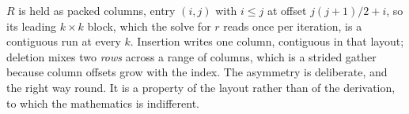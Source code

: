 \begin{remark}
$R$ is held as packed columns, entry $(i,j)$ with $i \le j$ at offset
$j(j+1)/2 + i$, so its leading $k \times k$ block, which the solve for $r$ reads
once per iteration, is a contiguous run at every $k$. Insertion writes one column,
contiguous in that layout; deletion mixes two \emph{rows} across a range of
columns, which is a strided gather because column offsets grow with the index. The
asymmetry is deliberate, and the right way round. It is a property of the
layout rather than of the derivation, to which the mathematics is indifferent.
\end{remark}
